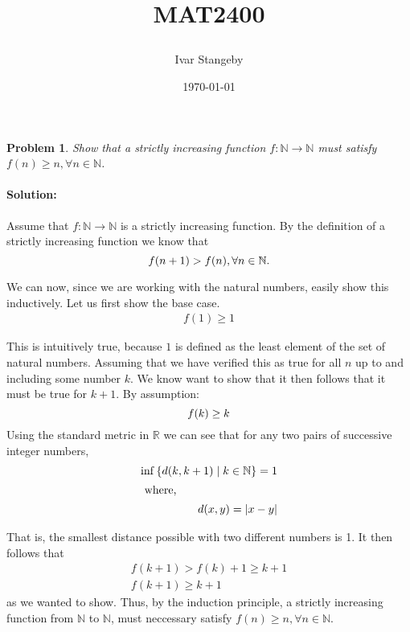 \documentclass[a4paper]{article}
\title{
  \huge MAT2400\\
  \centering{Assignment 1}
  \author{Ivar Stangeby}
  \date{\today}
}
\newtheorem{prb}{Problem}
\theoremstyle{plain}
\begin{document}
\maketitle
\begin{prb}
  Show that a strictly increasing function $f: \mathbb{N} \rightarrow
  \mathbb{N}$ must satisfy $f(n) \geq n, \forall n \in \mathbb{N}$.
\end{prb}

\paragraph{Solution: }
Assume that $f: \mathbb{N} \rightarrow \mathbb{N}$ is a strictly increasing
function.  By the definition of a strictly increasing function we know that
\begin{equation}
  \notag
  f(n + 1) > f(n), \forall n \in \mathbb{N}.
\end{equation}

We can now, since we are working with the natural numbers, easily show this
inductively.  Let us first show the base case.
\begin{align*}
  \label{eq:}
  f(1) \geq 1  
\end{align*}

This is intuitively true, because $1$ is defined as the least element of the
set of natural numbers.  Assuming that we have verified this as true for all
$n$ up to and including some number $k$.  We know want to show that it then
follows that it must be true for $k + 1$. 
By assumption:
\begin{equation}
  \notag
  f(k) \geq k
\end{equation}
Using the standard metric in $\mathbb{R}$ we can see that for any two pairs of successive
integer numbers, 
\begin{align*}
  \inf\left\{ d(k, k+1) \mid k \in \mathbb{N} \right \} = 1 \\
  \intertext{ where,}
  d(x, y) = |x - y|
\end{align*}

That is, the smallest distance possible with two different numbers is 1.  It
then follows that
\begin{align*}
  \label{eq:}
  f(k+1) > f(k) + 1 \geq k+1 \\
  f(k+1) \geq k+1
\end{align*}
as we wanted to show.  Thus, by the induction principle, a strictly increasing
function from $\mathbb{N}$ to $\mathbb{N}$, must neccessary satisfy $f(n) \geq
n, \forall n \in \mathbb{N}$.
\end{document}
